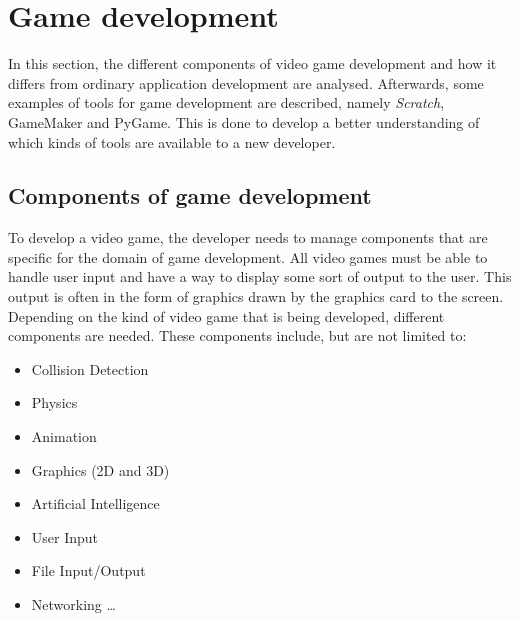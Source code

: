 \section{Game development}
In this section, the different components of video game development and how it differs from ordinary application development are analysed. Afterwards, some examples of tools for game development are described, namely \textit{Scratch}, GameMaker and PyGame. This is done to develop a better understanding of which kinds of tools are available to a new developer.


\subsection{Components of game development}


To develop a video game, the developer needs to manage components that are specific for the domain of game development. All video games must be able to handle user input and have a way to display some sort of output to the user. This output is often in the form of graphics drawn by the graphics card to the screen. Depending on the kind of video game that is being developed, different components are needed. These components include, but are not limited to: 

\begin{itemize}
 \item Collision Detection
 \item Physics
 \item Animation
 \item Graphics (2D and 3D)
 \item Artificial Intelligence
 \item User Input
 \item File Input/Output
 \item Networking \ldots
\end{itemize}

